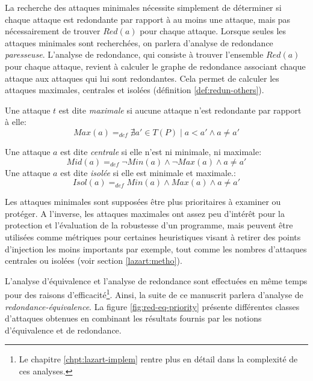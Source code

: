                 La recherche des attaques minimales nécessite simplement de déterminer si chaque attaque est redondante par rapport à au moins une attaque, mais pas nécessairement de trouver $Red(a)$ pour chaque attaque.
                Lorsque seules les attaques minimales sont recherchées, on parlera d'analyse de redondance \textit{paresseuse}.
                L'analyse de redondance, qui consiste à trouver l'ensemble $Red(a)$ pour chaque attaque, revient à calculer le graphe de redondance associant chaque attaque aux attaques qui lui sont redondantes. 
                Cela permet de calculer les attaques maximales, centrales et isolées (définition \ref{def:redun-others}).
        
                \begin{defi}[Terminologie]
                    \label{def:redun-others}
                    Une attaque $t$ est dite \textit{maximale} si aucune attaque n'est redondante par rapport à elle:
                        \[  
                        Max(a) =_{def} \nexists a' \in T(P) \mid a < a' \land a \neq a'
                        \] 
            
                    Une attaque $a$ est dite \textit{centrale} si elle n'est ni minimale, ni maximale:
                        \[  
                        Mid(a) =_{def} \neg Min(a) \land \neg Max(a) \land a \neq a'
                        \] 
                    Une attaque $a$ est dite \textit{isolée} si elle est minimale et maximale.:
                        \[  
                        Isol(a) =_{def} Min(a) \land Max(a) \land a \neq a'
                        \] 
                \end{defi}
                
                Les attaques minimales sont supposées être plus prioritaires à examiner ou protéger. 
                A l'inverse, les attaques maximales ont assez peu d'intérêt pour la protection et l'évaluation de la robustesse d'un programme, mais peuvent être utilisées comme métriques pour certaines heuristiques visant à retirer des points d'injection les moins importants par exemple, tout comme les nombres d'attaques centrales ou isolées (voir section \ref{lazart:metho}).
                
                L'analyse d'équivalence et l'analyse de redondance sont effectuées en même temps pour des raisons d'efficacité\footnote{Le chapitre \ref{chpt:lazart-implem} rentre plus en détail dans la complexité de ces analyses.}. Ainsi, la suite de ce manuscrit parlera d'analyse de \textit{redondance-équivalence}.
                La figure \ref{fig:red-eq-priority} présente différentes classes d'attaques obtenues en combinant les résultats fournis par les notions d'équivalence et de redondance. 
                
